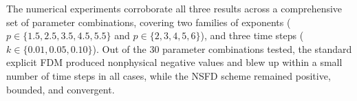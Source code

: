 \documentclass[final,12pt,3p]{elsarticle}
\theoremstyle{plain}
\theoremstyle{definition}
\theoremstyle{remark}
\begin{document}
The numerical experiments corroborate all three results across a comprehensive set of parameter combinations, covering two families of exponents ($p \in \{1.5, 2.5, 3.5, 4.5, 5.5\}$ and $p \in \{2, 3, 4, 5, 6\}$), 
and three time steps ($k \in \{0.01, 0.05, 0.10\}$).
Out of the 30 parameter combinations tested, the standard explicit FDM produced nonphysical negative values and blew up within a small number of time steps in all cases, while the NSFD scheme remained positive, bounded, and convergent.


\end{document}
